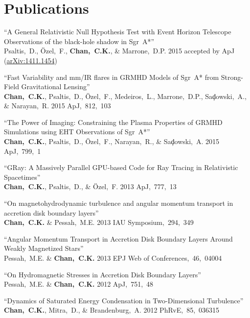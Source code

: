 \section*{Publications}

\begin{ilist}

\item ``A General Relativistic Null Hypothesis Test with Event Horizon Telescope Observations of the black-hole shadow in Sgr~A*''\\
  Psaltis,~D., {\"O}zel,~F., \textbf{Chan,~C.K.}, \& Marrone,~D.P.
  2015 accepted by ApJ (\href{http://arxiv.org/abs/1411.1454}{arXiv:1411.1454})

\item ``Fast Variability and mm/IR flares in GRMHD Models of Sgr~A* from Strong-Field Gravitational Lensing''\\
  \textbf{Chan,~C.K.}, Psaltis,~D., {\"O}zel,~F., Medeiros,~L., Marrone,~D.P., Sa{\c d}owski,~A., \& Narayan,~R.
  2015 ApJ,~812,~103

\item ``The Power of Imaging: Constraining the Plasma Properties of GRMHD Simulations using EHT Observations of Sgr~A*''\\
  \textbf{Chan,~C.K.}, Psaltis,~D., {\"O}zel,~F., Narayan,~R., \& Sa{\c d}owski,~A.
  2015 ApJ,~799,~1

\item ``GRay: A Massively Parallel GPU-based Code for Ray Tracing in Relativistic Spacetimes''\\
  \textbf{Chan,~C.K.}, Psaltis,~D., \& {\"O}zel,~F.
  2013 ApJ,~777,~13

\item ``On magnetohydrodynamic turbulence and angular momentum transport in accretion disk boundary layers''\\
  \textbf{Chan,~C.K.} \& Pessah,~M.E.
  2013 IAU Symposium,~294,~349

\item ``Angular Momentum Transport in Accretion Disk Boundary Layers Around Weakly Magnetized Stars''\\
  Pessah,~M.E. \& \textbf{Chan,~C.K.}
  2013  EPJ Web of Conferences,~46,~04004

\item ``On Hydromagnetic Stresses in Accretion Disk Boundary Layers''\\
  Pessah,~M.E. \& \textbf{Chan,~C.K.}
  2012 ApJ,~751,~48

\item ``Dynamics of Saturated Energy Condensation in Two-Dimensional Turbulence''\\
  \textbf{Chan,~C.K.}, Mitra,~D., \& Brandenburg,~A.
  2012 PhRvE,~85,~036315


\end{ilist}
